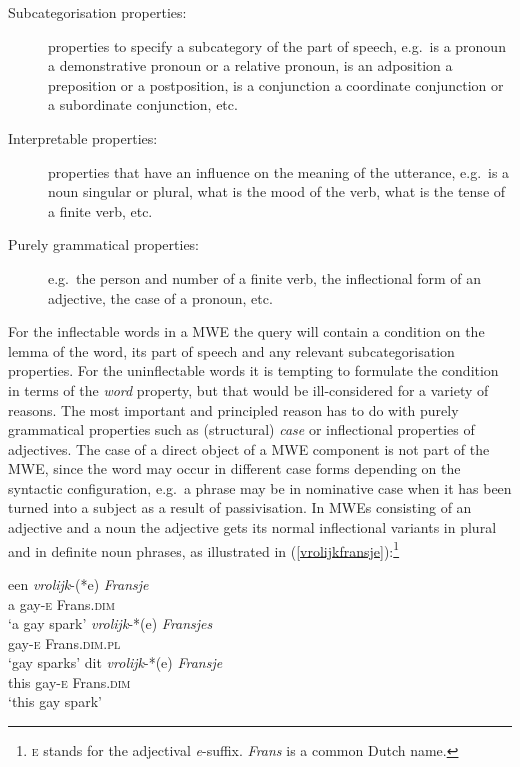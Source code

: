 \documentclass[output=paper,colorlinks,citecolor=brown]{langscibook}
\begin{document}
\begin{description}
\item[Subcategorisation properties:] properties to specify a subcategory of the part of speech, e.g.\ is a pronoun a demonstrative pronoun or a relative pronoun, is an adposition a preposition or a postposition, is a conjunction a coordinate conjunction or a subordinate conjunction, etc.

\item[Interpretable properties:] properties that have an influence on the meaning of the utterance, e.g.\ is a noun singular or plural, what is the mood of the verb, what is the tense of a finite verb, etc.

\item[Purely grammatical properties:] e.g.\ the person and number of a finite verb, the inflectional form of an adjective, the case of a pronoun, etc.
\end{description}

For the inflectable words in a MWE the query will contain a condition on the lemma of the word, its part of speech and any relevant subcategorisation properties.
For the uninflectable words it is tempting to formulate the condition in terms of the \textit{word} property, but that would be ill-considered for a variety of reasons. The most important and principled reason has to do with purely grammatical properties such as (structural) \textit{case} or inflectional properties of adjectives. The case of a direct object of a MWE component is not part of the MWE, since the word may occur in different case forms depending on the syntactic configuration, e.g.\ a phrase may be in nominative case when it has been turned into a subject as a result of passivisation. In MWEs consisting of an adjective and a noun the adjective gets its normal inflectional variants in plural and in definite noun phrases, as illustrated in (\ref{vrolijkfransje}):\footnote{\textsc{e} stands for the adjectival \textit{e}-suffix. \textit{Frans} is a common Dutch name.}

\begin{exe}
\ex \label{vrolijkfransje}
\begin{xlist}
\ex \gll een \textit{vrolijk}-(*e) \textit{Fransje}\\
a gay-\textsc{e} Frans.\textsc{dim}\\
\glt `a gay spark'
\ex \gll \textit{vrolijk}-*(e) \textit{Fransjes}\\
gay-\textsc{e} Frans.\textsc{dim}.\textsc{pl}\\
\glt `gay sparks' 
\ex \gll dit \textit{vrolijk}-*(e) \textit{Fransje}\\
this gay-\textsc{e} Frans.\textsc{dim}\\
\glt `this gay spark'
\end{xlist}
\end{exe}
\end{document}

